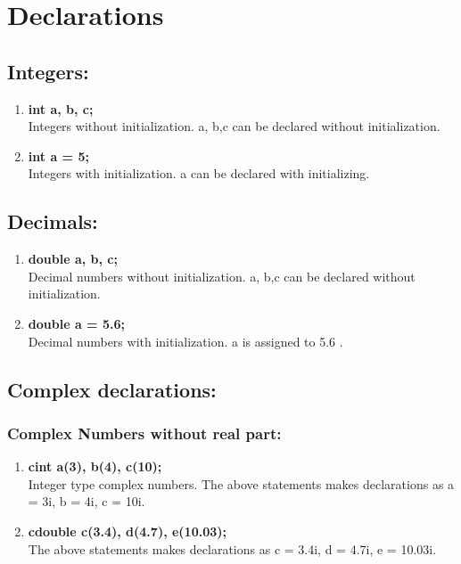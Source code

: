 \documentclass[12pt]{article}
\begin{document}
\section{Declarations}
\subsection{Integers:}

\begin{enumerate}
    \item \textbf{int a, b, c;} \\
        Integers without initialization. a, b,c can be declared without initialization.
    \item  \textbf{int a = 5;}\\
        Integers with initialization. a can be declared with initializing.
\end{enumerate}

\subsection{Decimals:}
\begin{enumerate}
    \item \textbf{double a, b, c;} \\
        Decimal numbers without initialization. a, b,c can be declared without initialization.
    \item  \textbf{double a = 5.6;}\\
        Decimal numbers with initialization. a is assigned to 5.6 .
\end{enumerate}
\subsection{Complex declarations:}
\subsubsection{Complex Numbers without real part:}
\begin{enumerate}
    \item \textbf{cint a(3), b(4), c(10);}\\
Integer type complex numbers.
The above statements makes declarations as a = 3i, b = 4i, c = 10i.
    \item \textbf{cdouble c(3.4), d(4.7), e(10.03);} \\
The above statements makes declarations as c = 3.4i, d = 4.7i, e = 10.03i.
\end{enumerate}
\end{document}
